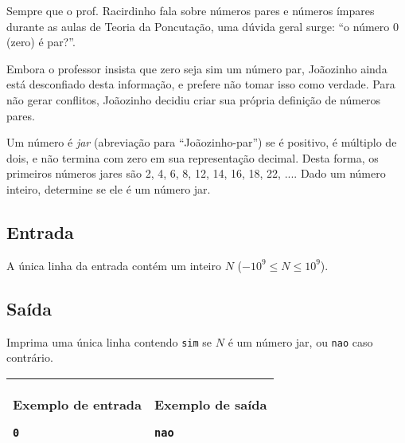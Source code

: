 \vspace{-0.5cm}
Sempre que o prof. Racirdinho fala sobre números pares e números ímpares durante
as aulas de Teoria da Poncutação, uma dúvida geral surge: ``o número 0 (zero) é
par?''.

Embora o professor insista que zero seja sim um número par, Joãozinho ainda está
desconfiado desta informação, e prefere não tomar isso como verdade. Para não
gerar conflitos, Joãozinho decidiu criar sua própria definição de números pares.

Um número é \textit{jar} (abreviação para ``Joãozinho-par'') se é positivo, é
múltiplo de dois, e não termina com zero em sua representação decimal.
Desta forma, os primeiros números jares são 2, 4, 6, 8, 12, 14, 16, 18, 22, ....
Dado um número inteiro, determine se ele é um número jar.

\subsection*{Entrada}

A única linha da entrada contém um inteiro $N$ ($-10^9 \leq N \leq 10^9$).

\subsection*{Saída}

Imprima uma única linha contendo \verb|sim| se $N$ é um número jar, ou
\verb|nao| caso contrário.

\begin{table}[!h]
\centering
\begin{tabular}{|l|l|}
\hline
\begin{minipage}[t]{3in}
\textbf{Exemplo de entrada}
\begin{verbatim}
0
\end{verbatim}
\vspace{1mm}
\end{minipage}
&
\begin{minipage}[t]{3in}
\textbf{Exemplo de saída}
\begin{verbatim}
nao
\end{verbatim}
\vspace{1mm}
\end{minipage} \\
\hline
\end{tabular}
\end{table}

